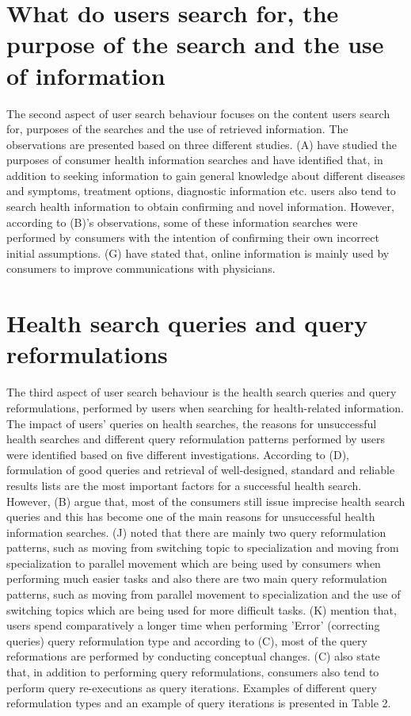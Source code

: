 \documentclass[]{article}
\begin{document}
\section{What do users search for, the purpose of the search and the use of information}


The second aspect of user search behaviour focuses on the content users search for, purposes of the searches and the use of retrieved information. The observations are presented based on three different studies. (A) have studied the purposes of consumer health information searches and have identified that, in addition to seeking information to gain general knowledge about different diseases and symptoms, treatment options, diagnostic information etc. users also tend to search health information to obtain confirming and novel information. However, according to (B)'s observations, some of these information searches were performed by consumers with the intention of confirming their own incorrect initial assumptions. (G) have stated that, online information is mainly used by consumers to improve communications with physicians. 



\section{Health search queries and query reformulations}


The third aspect of user search behaviour is the health search queries and query reformulations, performed by users when searching for health-related information. The impact of users' queries on health searches, the reasons for unsuccessful health searches and different query reformulation patterns performed by users were identified based on five different investigations. According to (D), formulation of good queries and retrieval of well-designed, standard and reliable results lists are the most important factors for a successful health search. However, (B) argue that, most of the consumers still issue imprecise health search queries and this has become one of the main reasons for unsuccessful health information searches. (J) noted that there are mainly two query reformulation patterns, such as moving from switching topic to specialization and moving from specialization to parallel movement which are being used by consumers when performing much easier tasks and also there are two main query reformulation patterns, such as moving from parallel movement to specialization and the use of switching topics which are being used for more difficult tasks. (K) mention that, users spend comparatively a longer time when performing 'Error' (correcting queries) query reformulation type and according to (C), most of the query reformations are performed by conducting conceptual changes. (C) also state that, in addition to performing query reformulations, consumers also tend to perform query re-executions as query iterations. Examples of different query reformulation types and an example of query iterations is presented in Table 2.
\end{document}
